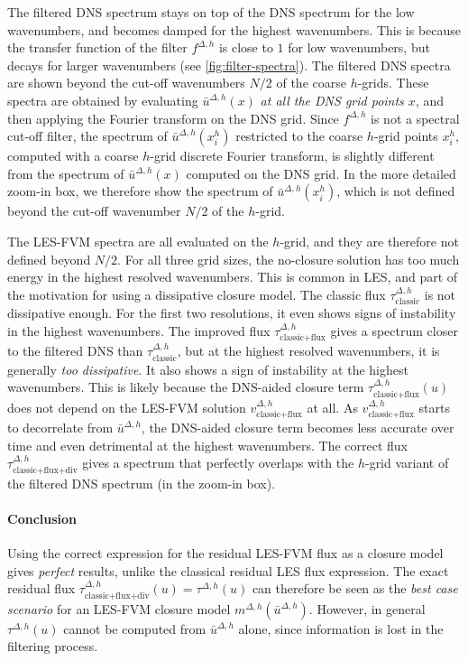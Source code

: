 \documentclass[preprint,twocolumn,5p]{elsarticle}
\begin{document}
The filtered DNS spectrum stays on top of the DNS spectrum for the low
wavenumbers, and becomes damped for the highest wavenumbers.
This is because the transfer function of the filter $f^{\Delta, h}$
is close to $1$ for low wavenumbers, but decays for larger wavenumbers
(see \cref{fig:filter-spectra}).
The filtered DNS spectra are shown beyond the cut-off wavenumbers
$N / 2$ of the coarse $h$-grids.
These spectra are obtained by evaluating $\bar{u}^{\Delta, h}(x)$
\emph{at all the DNS grid points $x$},
and then applying the Fourier transform on the DNS grid.
Since $f^{\Delta, h}$ is not a spectral cut-off filter,
the spectrum of $\bar{u}^{\Delta, h}(x^h_i)$
restricted to the coarse $h$-grid points $x^h_i$,
computed with a coarse $h$-grid discrete Fourier transform,
is slightly different from the spectrum of $\bar{u}^{\Delta, h}(x)$ computed on the DNS grid.
In the more detailed zoom-in box, we therefore show the spectrum of
$\bar{u}^{\Delta, h}(x^h_i)$,
which is not defined beyond the cut-off wavenumber $N / 2$ of the
$h$-grid.

The LES-FVM spectra are all evaluated on the $h$-grid, and they are therefore
not defined beyond $N / 2$.
For all three grid sizes, the no-closure solution has too much energy in the
highest resolved wavenumbers. This is common in LES, and part of the motivation
for using a dissipative closure model.
The classic flux $\tau^{\Delta, h}_\text{classic}$ is not dissipative enough.
For the first two resolutions, it even shows signs of instability in the
highest wavenumbers.
The improved flux $\tau^{\Delta, h}_\text{classic+flux}$ gives a spectrum
closer to the filtered DNS than $\tau^{\Delta, h}_\text{classic}$,
but at the highest resolved wavenumbers, it is generally
\emph{too dissipative}.
It also shows a sign of instability at the highest wavenumbers.
This is likely because the DNS-aided closure term
$\tau^{\Delta, h}_\text{classic+flux}(u)$
does not depend on the LES-FVM solution $v^{\Delta, h}_\text{classic+flux}$ at all.
As $v^{\Delta, h}_\text{classic+flux}$ starts to decorrelate from $\bar{u}^{\Delta, h}$,
the DNS-aided closure term becomes less accurate over time and even detrimental
at the highest wavenumbers.
The correct flux $\tau^{\Delta, h}_\text{classic+flux+div}$ gives a spectrum
that perfectly overlaps with the $h$-grid variant of the filtered DNS
spectrum (in the zoom-in box).

\paragraph{Conclusion}
Using the correct expression for the residual LES-FVM flux as a closure
model gives \emph{perfect} results, unlike the classical residual LES flux
expression.
The exact residual flux $\tau^{\Delta, h}_\text{classic+flux+div}(u) = \tau^{\Delta, h}(u)$
can therefore be seen as the
\emph{best case scenario} for an LES-FVM closure model
$m^{\Delta, h}(\bar{u}^{\Delta, h})$.
However, in general $\tau^{\Delta, h}(u)$ cannot
be computed from $\bar{u}^{\Delta, h}$ alone,
since information is lost in the filtering process.
\end{document}
